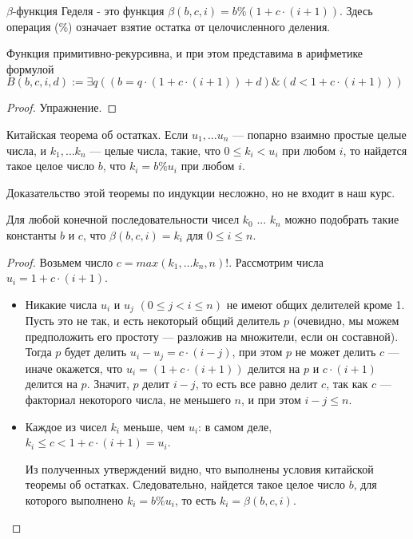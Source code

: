 \begin{definition}
$\beta$-функция Геделя - это функция $\beta (b,c,i) = b \% (1 + c \cdot (i + 1))$. Здесь операция (\%) означает
взятие остатка от целочисленного деления.
\end{definition}

\begin{lemma}Функция примитивно-рекурсивна, и при этом представима в арифметике 
формулой $B (b,c,i,d) := \exists q ((b = q \cdot (1 + c \cdot (i+1)) + d) \& (d < 1 + c \cdot (i+1)))$
\end{lemma}
\begin{proof}Упражнение.\end{proof}

\begin{theorem}Китайская теорема об остатках.
Если $u_1, \dots u_n$ --- попарно взаимно простые целые числа,
и $k_1, \dots k_n$ --- целые числа, такие, что $0 \le k_i < u_i$
при любом $i$, то найдется такое целое число $b$, что
$k_i = b \% u_i$ при любом $i$.
\end{theorem}

Доказательство этой теоремы по индукции несложно, но не входит в наш курс. 

\begin{lemma} 
Для любой конечной последовательности чисел $k_0$ ... $k_n$ можно подобрать
такие константы $b$ и $c$, что $\beta (b,c,i) = k_i$ для $0 \le i \le n$.
\end{lemma}

\begin{proof}
Возьмем число $c = max(k_1,\dots k_n,n)!$. Рассмотрим числа $u_i = 1 + c \cdot (i+1)$. 

\begin{itemize}

\item Никакие числа $u_i$ и $u_j$ $(0 \le j < i \le n)$ не имеют общих делителей кроме 1.
Пусть это не так, и есть некоторый общий делитель $p$ (очевидно, мы можем предположить его
простоту --- разложив на множители, если он составной).
Тогда $p$ будет делить $u_i - u_j = c \cdot (i - j)$,
при этом $p$ не может делить $c$ --- иначе окажется, что $u_i = (1 + c \cdot (i+1))$ делится на $p$
и $c \cdot (i+1)$ делится на $p$. Значит, $p$ делит $i-j$, то есть все равно делит $c$, так как
$c$ --- факториал некоторого числа, не меньшего $n$, и при этом $i-j \le n$.

\item Каждое из чисел $k_i$ меньше, чем $u_i$: в самом деле, $k_i \le c < 1 + c \cdot (i+1) = u_i$.

Из полученных утверждений видно, что выполнены условия китайской 
теоремы об остатках.
Следовательно, найдется такое целое число $b$, для которого 
выполнено $k_i = b \% u_i$, то есть $k_i = \beta (b,c,i)$.
\end{itemize}
\end{proof}

